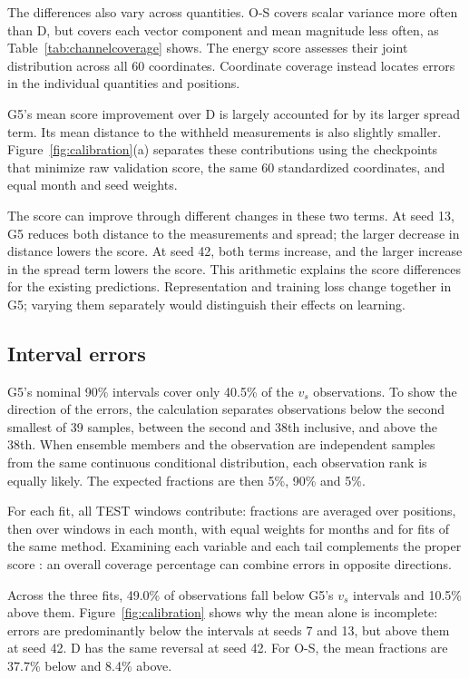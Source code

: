 \documentclass{article}
\begin{document}
The differences also vary across quantities. O-S covers scalar variance more often than D, but covers each vector component and mean magnitude less often, as Table~\ref{tab:channelcoverage} shows. The energy score assesses their joint distribution across all 60 coordinates. Coordinate coverage instead locates errors in the individual quantities and positions.

G5's mean score improvement over D is largely accounted for by its larger spread term. Its mean distance to the withheld measurements is also slightly smaller. Figure~\ref{fig:calibration}(a) separates these contributions using the checkpoints that minimize raw validation score, the same 60 standardized coordinates, and equal month and seed weights.

The score can improve through different changes in these two terms. At seed 13, G5 reduces both distance to the measurements and spread; the larger decrease in distance lowers the score. At seed 42, both terms increase, and the larger increase in the spread term lowers the score. This arithmetic explains the score differences for the existing predictions. Representation and training loss change together in G5; varying them separately would distinguish their effects on learning.

\subsection{Interval errors}
G5's nominal 90\% intervals cover only 40.5\% of the $v_s$ observations. To show the direction of the errors, the calculation separates observations below the second smallest of 39 samples, between the second and 38th inclusive, and above the 38th. When ensemble members and the observation are independent samples from the same continuous conditional distribution, each observation rank is equally likely. The expected fractions are then 5\%, 90\% and 5\%.

For each fit, all TEST windows contribute: fractions are averaged over positions, then over windows in each month, with equal weights for months and for fits of the same method. Examining each variable and each tail complements the proper score \citep{gneiting2007calibration}: an overall coverage percentage can combine errors in opposite directions.

Across the three fits, 49.0\% of observations fall below G5's $v_s$ intervals and 10.5\% above them. Figure~\ref{fig:calibration} shows why the mean alone is incomplete: errors are predominantly below the intervals at seeds 7 and 13, but above them at seed 42. D has the same reversal at seed 42. For O-S, the mean fractions are 37.7\% below and 8.4\% above.
\end{document}
